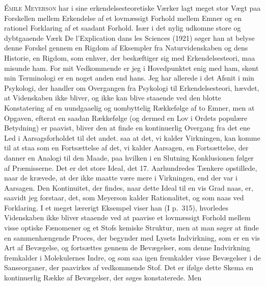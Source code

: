 \documentclass[12pt]{article}
\newcommand{\opage}[1]{\marginnote{\footnotesize\textit{[#1]}}}
\begin{document}
\textsc{Émile Meyerson} har i sine erkendelsesteoretiske Værker lagt
meget stor Vægt paa Forskellen mellem Erkendelse af
\opage{53} et lovmæssigt Forhold mellem Emner og en rationel Forklaring af et
saadant Forhold. Især i det nylig udkomne store og dybtgaaende Værk
\guillemotright De l'Explication dans les Sciences\guillemotleft{} (1921)
søger han at belyse denne Forskel gennem en Rigdom af Eksempler fra
Naturvidenskaben og dens Historie, en Rigdom, som enhver, der beskæftiger
sig med Erkendelsesteori, maa misunde ham. For mit Vedkommende er jeg i
Hovedpunktet enig med ham, skønt min Terminologi er en noget anden end
hans. Jeg har allerede i det Afsnit i min Psykologi, der handler om
Overgangen fra Psykologi til Erkendelsesteori, hævdet, at Videnskaben
ikke bliver, og ikke kan blive staaende ved den blotte Konstatering af en
uundgaaelig og uombyttelig Rækkefølge af to Emner, men at Opgaven,
efterat en saadan Rækkefølge (og dermed en \guillemotright
Lov\guillemotleft{} i Ordets populære Betydning) er paavist, bliver den
at finde en kontinuerlig Overgang fra det ene Led i Aarsagsforholdet til
det andet. saa at det, vi kalder Virkningen, kan komme til at staa som en
Fortsættelse af det, vi kalder Aarsagen, en Fortsættelse, der danner en
Analogi til den Maade, paa hvilken i en Slutning Konklusionen
\guillemotright følger\guillemotleft{} af Præmisserne. Det er det store
Ideal, det 17. Aarhundredes Tænkere opstillede, naar de krævede, at der
ikke maatte være mere i Virkningen, end der var i Aarsagen. Den
Kontinuitet, der findes, naar dette Ideal til en vis Grad naas, er,
saavidt jeg forstaar, det, som Meyerson kalder Rationalitet, og som naas
ved \guillemotright Forklaring\guillemotleft . I et meget lærerigt
Eksempel viser han (I p.~315), hvorledes Videnskaben ikke bliver staaende
ved at paavise et lovmæssigt Forhold mellem visse optiske Fænomener og et
Stofs kemiske Struktur, men at man søger at finde en sammenhængende
Proces, der begynder med Lysets Indvirkning, som er en vis Art af
Bevægelse,
\opage{54} og fortsættes gennem de Bevægelser, som denne Indvirkning fremkalder i
Molekulernes Indre, og som saa igen fremkalder visse Bevægelser i de
Sanseorganer, der paavirkes af vedkommende Stof. Det er ifølge dette
Skema en kontinuerlig Række af Bevægelser, der søges konstaterede. Men
\end{document}
